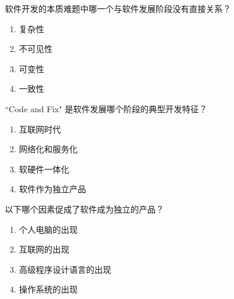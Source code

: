 \begin{problem}
    软件开发的本质难题中哪一个与软件发展阶段没有直接关系？
    \vspace{-0.8em}
    \begin{multicols}{4}
        \begin{enumerate}[label=\Alph*.]
            \item 复杂性
            \item 不可见性
            \item 可变性
            \item 一致性
        \end{enumerate}
    \end{multicols}
    \vspace{-1em}
\end{problem}



\begin{problem}
    ``Code and Fix" 是软件发展哪个阶段的典型开发特征？
    \vspace{-0.8em}
    \begin{multicols}{4}
        \begin{enumerate}[label=\Alph*.]
            \item 互联网时代
            \item 网络化和服务化
            \item 软硬件一体化
            \item 软件作为独立产品
        \end{enumerate}
    \end{multicols}
    \vspace{-1em}
\end{problem}



\begin{problem}
    以下哪个因素促成了软件成为独立的产品？
    \vspace{-0.8em}
    \begin{multicols}{2}
        \begin{enumerate}[label=\Alph*.]
            \item 个人电脑的出现
            \item 互联网的出现
            \item 高级程序设计语言的出现
            \item 操作系统的出现
        \end{enumerate}
    \end{multicols}
    \vspace{-1em}
\end{problem}



